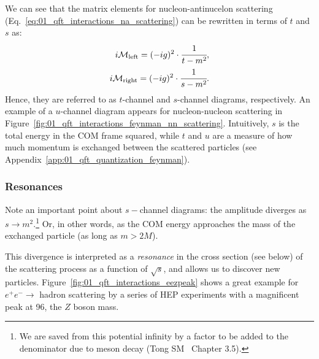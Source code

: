 We can see that the matrix elements for nucleon-antinucelon scattering (Eq.~\ref{eq:01_qft_interactions_na_scattering}) can be rewritten in terms of $t$ and $s$ as:
\begin{equation}
	\label{eq:01_qft_interactions_nn_tchannel_uchannel}
	\begin{split}
		i \mathcal M_\mathrm{left} = (-ig)^2 \cdot \cfrac{1}{t - m^2}, \\
		i \mathcal M_\mathrm{right} = (-ig)^2 \cdot \cfrac{1}{s - m^2}.
	\end{split}
\end{equation}
Hence, they are referred to as $t$-channel and $s$-channel diagrams, respectively.
An example of a $u$-channel diagram appears for nucleon-nucleon scattering in Figure~\ref{fig:01_qft_interactions_feynman_nn_scattering}.
Intuitively, $s$ is the total energy in the COM frame squared, while $t$ and $u$ are a measure of how much momentum is exchanged between the scattered particles (see Appendix~\ref{app:01_qft_quantization_feynman}).


\subsubsection{Resonances}

Note an important point about $s-$channel diagrams: the amplitude diverges as $s \rightarrow m^2$.\footnote{We are saved from this potential infinity by a factor to be added to the denominator due to meson decay (Tong SM~\cite{TongSM} Chapter 3.5).}
Or, in other words, as the COM energy approaches the mass of the exchanged particle (as long as $m > 2M$).

This divergence is interpreted as a \textit{resonance} in the cross section (see below) of the scattering process as a function of $\sqrt{s}$, and allows us to discover new particles.
Figure~\ref{fig:01_qft_interactions_eezpeak} shows a great example for $e^+e^- \rightarrow$ hadron scattering by a series of HEP experiments with a magnificent peak at 96\GeV, the $Z$ boson mass.

